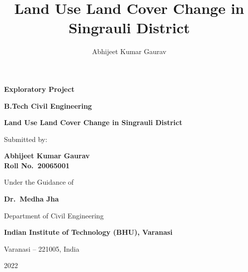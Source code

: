 \documentclass[11pt]{article}
\title{Land Use Land Cover Change in Singrauli District}
\author{Abhijeet Kumar Gaurav}
\date{}
\begin{document}
\begin{titlepage}
  \centering
  \vspace*{0.5cm}
  {\large\bfseries Exploratory Project}\par
  \vspace{0.3cm}
  {\Large\bfseries B.Tech Civil Engineering}\par
  \vspace{1.2cm}
  {\Huge\bfseries Land Use Land Cover Change in Singrauli District}\par
  \vspace{2cm}
  Submitted by:\par
  \vspace{0.2cm}
  {\bfseries Abhijeet Kumar Gaurav \\ Roll No.\ 20065001}\par
  \vspace{0.8cm}
  Under the Guidance of\par
  \vspace{0.2cm}
  {\bfseries Dr.\ Medha Jha}\par
  \vspace{1.2cm}
  Department of Civil Engineering\par
  \textbf{Indian Institute of Technology (BHU), Varanasi}\par
  Varanasi -- 221005, India\par
  \vspace{0.3cm}
  2022\par
\end{titlepage}

\end{document}
